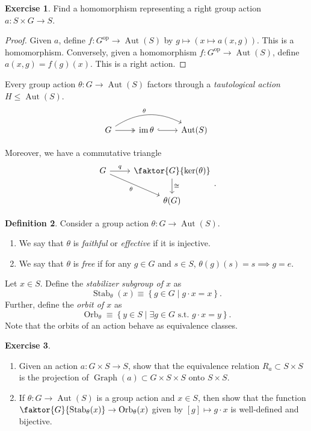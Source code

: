 \documentclass[10pt,letterpaper,cm]{nupset}
\theoremstyle{definition}
\newtheorem{definition}{Definition}[subsection]
\theoremstyle{theorem}
\newtheorem{exercise}[definition]{Exercise}
\theoremstyle{remark}
\newcommand{\1}{\mathbf{1}}
\newcommand{\0}{\vec 0}
\DeclareMathOperator{\graph}{Graph}
\DeclareMathOperator{\aut}{Aut}
\DeclareMathOperator{\stab}{Stab}
\DeclareMathOperator{\orb}{Orb}
\DeclareMathOperator{\op}{op}
\DeclareMathOperator{\im}{im}
\begin{document}
\begin{exercise} 
Find a homomorphism representing a right group action $a: S \times G \to S$.
\end{exercise}
\begin{proof}
Given $a$, define $f: G^{\op} \to \aut(S)$ by $g \mapsto \left(x \mapsto a(x, g)\right)$. This is a homomorphism. Conversely, given a homomorphism $f: G^{\op} \to \aut(S)$, define $a(x, g) = f(g)(x)$. This is a right action.
\end{proof}

\medskip

Every group action $\theta: G \to \aut(S)$ factors through a \textit{tautological action} $H \leq \aut(S)$. 
\[
\begin{tikzcd}
G \arrow[r, two heads] \arrow[rr, "\theta", bend left] & \im{\theta} \arrow[r, hook] & \aut(S)
\end{tikzcd}
\]

Moreover, we have a commutative triangle
\[ \begin{tikzcd}
G \arrow{r}{q} \arrow[swap]{dr} {\theta} & \faktor{G}{\ker(\theta)} \arrow{d}{\cong} \\%
 & \theta(G)
\end{tikzcd}.
\]

\medskip

\begin{definition}
Consider a group action $\theta: G \to \aut(S)$.
\begin{enumerate}
\item We say that $\theta$ is \textit{faithful} or \textit{effective} if it is injective. 
\item We say that $\theta$ is \textit{free} if for any $g\in G$ and $s\in S$, $\theta(g)(s) =s \implies g =e$.
\end{enumerate}
\end{definition}

\smallskip

 Let $x\in S$. Define the \textit{stabilizer subgroup of $x$} as 
 \[
 \stab_{\theta}(x)  \equiv \left\{g \in G \mid g \cdot x = x\right\}.
 \] Further, define the \textit{orbit of $x$} as $$\orb_{\theta} \equiv \left\{y \in S \mid \exists g \in G \text{ s.t. }g \cdot x = y\right\}.$$ Note that the orbits of an action behave as equivalence classes. 


\begin{exercise} $ $
\begin{enumerate}
\item Given an action $a: G \times S \to S$, show that the equivalence relation $R_a \subset S \times S$ is the projection of $\graph(a) \subset G\times S \times S$ onto $S \times S$.
\item If $\theta : G \to \aut(S)$ is a group action and $x\in S$, then show that the function $\faktor{G}{\stab_{\theta}(x)} \to \orb_{\theta}(x)$ given by $[g] \mapsto g \cdot x$ is well-defined and bijective.
\end{enumerate}
\end{exercise}
\end{document}
